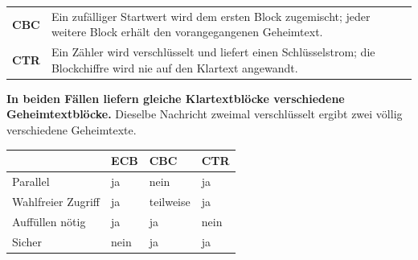 \begin{merksatz}
\begin{center}
{\small
\renewcommand{\arraystretch}{1.5}
\begin{tabular}{@{}P{2.4cm}P{6.2cm}@{}}
\toprule
\textbf{CBC} & Ein zufälliger Startwert wird dem ersten Block zugemischt; jeder weitere Block erhält den vorangegangenen Geheimtext.\\
\textbf{CTR} & Ein Zähler wird verschlüsselt und liefert einen Schlüsselstrom; die Blockchiffre wird nie auf den Klartext angewandt.\\
\bottomrule
\end{tabular}}
\end{center}

\begin{center}
\begin{minipage}{0.9\textwidth}
\textbf{In beiden Fällen liefern gleiche Klartextblöcke verschiedene Geheimtextblöcke.} Dieselbe Nachricht zweimal verschlüsselt ergibt zwei völlig verschiedene Geheimtexte.
\end{minipage}
\end{center}

\begin{center}
{\small
\renewcommand{\arraystretch}{1.48}
\begin{tabular}{@{}P{2.2cm}P{2.0cm}P{2.0cm}P{2.0cm}@{}}
\toprule
& \textbf{ECB} & \textbf{CBC} & \textbf{CTR}\\
\midrule
Parallel & \textcolor{gruen}{ja} & \textcolor{akzent}{nein} & \textcolor{gruen}{ja}\\
Wahlfreier Zugriff & \textcolor{gruen}{ja} & teilweise & \textcolor{gruen}{ja}\\
Auffüllen nötig & ja & ja & \textcolor{gruen}{nein}\\
Sicher & \textcolor{akzent}{nein} & \textcolor{gruen}{ja} & \textcolor{gruen}{ja}\\
\bottomrule
\end{tabular}}
\end{center}

\begin{center}
\begin{minipage}{0.88\textwidth}
\end{minipage}
\end{center}
\end{merksatz}

